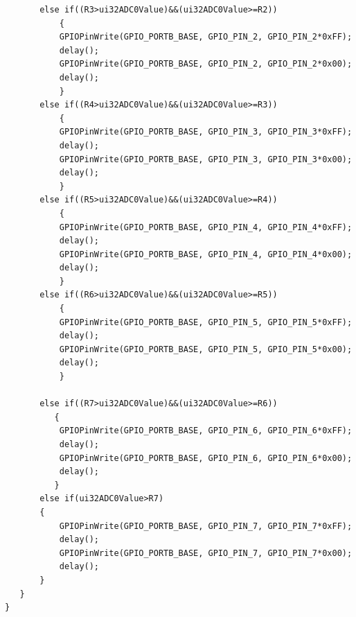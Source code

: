 \begin{lstlisting}
       else if((R3>ui32ADC0Value)&&(ui32ADC0Value>=R2))
           {
           GPIOPinWrite(GPIO_PORTB_BASE, GPIO_PIN_2, GPIO_PIN_2*0xFF);
           delay();
           GPIOPinWrite(GPIO_PORTB_BASE, GPIO_PIN_2, GPIO_PIN_2*0x00);
           delay();
           }
       else if((R4>ui32ADC0Value)&&(ui32ADC0Value>=R3))
           {
           GPIOPinWrite(GPIO_PORTB_BASE, GPIO_PIN_3, GPIO_PIN_3*0xFF);
           delay();
           GPIOPinWrite(GPIO_PORTB_BASE, GPIO_PIN_3, GPIO_PIN_3*0x00);
           delay();
           }
       else if((R5>ui32ADC0Value)&&(ui32ADC0Value>=R4))
           {
           GPIOPinWrite(GPIO_PORTB_BASE, GPIO_PIN_4, GPIO_PIN_4*0xFF);
           delay();
           GPIOPinWrite(GPIO_PORTB_BASE, GPIO_PIN_4, GPIO_PIN_4*0x00);
           delay();
           }
       else if((R6>ui32ADC0Value)&&(ui32ADC0Value>=R5))
           {
           GPIOPinWrite(GPIO_PORTB_BASE, GPIO_PIN_5, GPIO_PIN_5*0xFF);
           delay();
           GPIOPinWrite(GPIO_PORTB_BASE, GPIO_PIN_5, GPIO_PIN_5*0x00);
           delay();
           }

       else if((R7>ui32ADC0Value)&&(ui32ADC0Value>=R6))
          {
           GPIOPinWrite(GPIO_PORTB_BASE, GPIO_PIN_6, GPIO_PIN_6*0xFF);
           delay();
           GPIOPinWrite(GPIO_PORTB_BASE, GPIO_PIN_6, GPIO_PIN_6*0x00);
           delay();
          }
       else if(ui32ADC0Value>R7)
       {
           GPIOPinWrite(GPIO_PORTB_BASE, GPIO_PIN_7, GPIO_PIN_7*0xFF);
           delay();
           GPIOPinWrite(GPIO_PORTB_BASE, GPIO_PIN_7, GPIO_PIN_7*0x00);
           delay();
       }
   }
}
\end{lstlisting}
